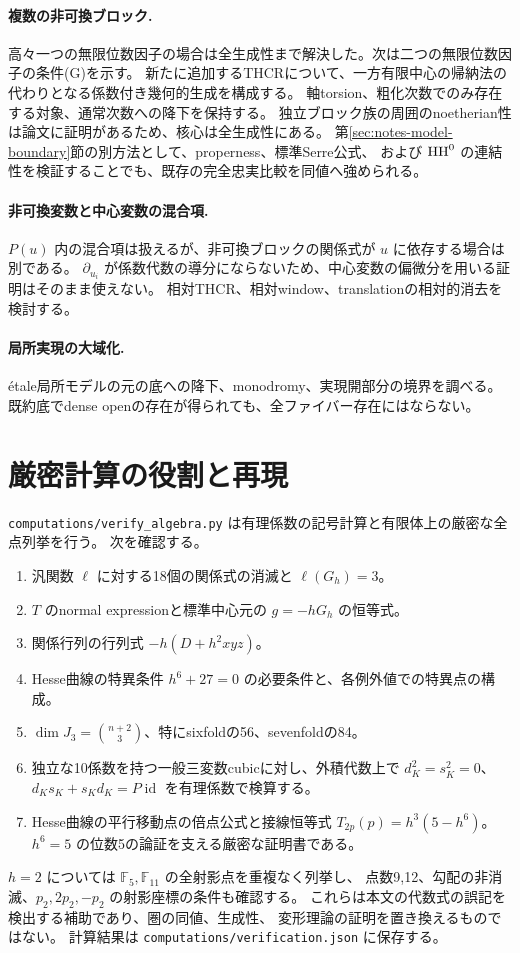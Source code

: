\paragraph{複数の非可換ブロック.}
高々一つの無限位数因子の場合は全生成性まで解決した。次は二つの無限位数因子の条件(G)を示す。
新たに追加するTHCRについて、一方有限中心の帰納法の代わりとなる係数付き幾何的生成を構成する。
軸torsion、粗化次数でのみ存在する対象、通常次数への降下を保持する。
独立ブロック族の周囲のnoetherian性は論文に証明があるため、核心は全生成性にある。
第\ref{sec:notes-model-boundary}節の別方法として、properness、標準Serre公式、
および \(\operatorname{HH}^0\) の連結性を検証することでも、既存の完全忠実比較を同値へ強められる。

\paragraph{非可換変数と中心変数の混合項.}
\(P(u)\) 内の混合項は扱えるが、非可換ブロックの関係式が \(u\) に依存する場合は別である。
\(\partial_{u_i}\) が係数代数の導分にならないため、中心変数の偏微分を用いる証明はそのまま使えない。
相対THCR、相対window、translationの相対的消去を検討する。

\paragraph{局所実現の大域化.}
étale局所モデルの元の底への降下、monodromy、実現開部分の境界を調べる。
既約底でdense openの存在が得られても、全ファイバー存在にはならない。

\section{厳密計算の役割と再現}

\texttt{computations/verify\_algebra.py} は有理係数の記号計算と有限体上の厳密な全点列挙を行う。
次を確認する。
\begin{enumerate}
 \item 汎関数 \(\ell\) に対する18個の関係式の消滅と \(\ell(G_h)=3\)。
 \item \(T\) のnormal expressionと標準中心元の \(g=-hG_h\) の恒等式。
 \item 関係行列の行列式 \(-h(D+h^2xyz)\)。
 \item Hesse曲線の特異条件 \(h^6+27=0\) の必要条件と、各例外値での特異点の構成。
 \item \(\dim J_3=\binom{n+2}{3}\)、特にsixfoldの56、sevenfoldの84。
 \item 独立な10係数を持つ一般三変数cubicに対し、外積代数上で
 \(d_K^2=s_K^2=0\)、\(d_Ks_K+s_Kd_K=P\operatorname{id}\) を有理係数で検算する。
 \item Hesse曲線の平行移動点の倍点公式と接線恒等式
 \(T_{2p}(p)=h^3(5-h^6)\)。\(h^6=5\) の位数5の論証を支える厳密な証明書である。
\end{enumerate}
\(h=2\) については \(\mathbb F_5,\mathbb F_{11}\) の全射影点を重複なく列挙し、
点数9,12、勾配の非消滅、\(p_2,2p_2,-p_2\) の射影座標の条件も確認する。
これらは本文の代数式の誤記を検出する補助であり、圏の同値、生成性、
変形理論の証明を置き換えるものではない。
計算結果は \texttt{computations/verification.json} に保存する。

